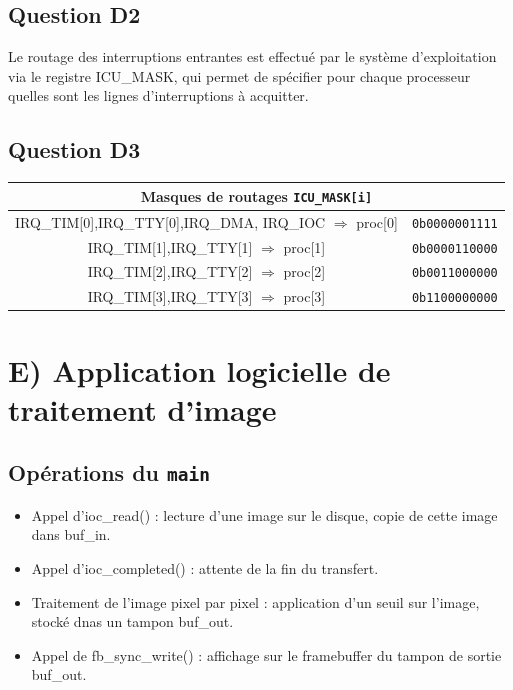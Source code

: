 \documentclass[10pt]{article}
\begin{document}
\subsection{Question D2}
Le routage des interruptions entrantes est effectué par le système
d'exploitation via le registre ICU\_MASK, qui permet de spécifier pour chaque
processeur quelles sont les lignes d'interruptions à acquitter.

\subsection{Question D3}
\begin{center}
  \begin{tabular}{|c|c|}
    \hline
    \multicolumn{2}{|c|}{Masques de routages \texttt{ICU\_MASK[i]}} \\ \hline
    IRQ\_TIM[0],IRQ\_TTY[0],IRQ\_DMA, IRQ\_IOC \hfill $\Rightarrow$ proc[0] & \texttt{0b0000001111} \\ \hline
    IRQ\_TIM[1],IRQ\_TTY[1] \hfill $\Rightarrow$ proc[1] & \texttt{0b0000110000} \\ \hline
    IRQ\_TIM[2],IRQ\_TTY[2] \hfill $\Rightarrow$ proc[2] & \texttt{0b0011000000} \\ \hline
    IRQ\_TIM[3],IRQ\_TTY[3] \hfill $\Rightarrow$ proc[3] & \texttt{0b1100000000} \\ \hline
  \end{tabular}
\end{center}

\section{E) Application logicielle de traitement d'image}
\subsection{Opérations du \texttt{main}}
\begin{itemize}
  \item Appel d'ioc\_read() : lecture d'une image sur le disque, copie de cette
  image dans buf\_in.
  \item Appel d'ioc\_completed() : attente de la fin du transfert.
  \item Traitement de l'image pixel par pixel  : application d'un seuil sur
  l'image, stocké dnas un tampon buf\_out.
  \item Appel de fb\_sync\_write() : affichage sur le framebuffer du tampon de
  sortie buf\_out.
\end{itemize}
\end{document}
